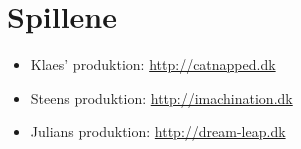 
\chapter{Spillene}
\label{cha:spillene}

\begin{itemize}
\item Klaes' produktion: \url{http://catnapped.dk}
\item Steens produktion: \url{http://imachination.dk}
\item Julians produktion: \url{http://dream-leap.dk}
\end{itemize}

